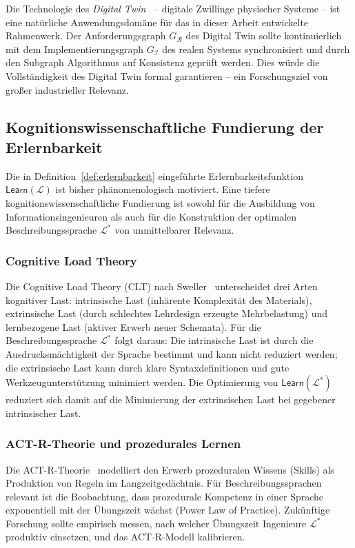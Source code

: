 ﻿\documentclass[a4paper,12pt]{article}
\theoremstyle{definition}
\begin{document}
Die Technologie des \emph{Digital Twin}~\cite{grieves2014} -- digitale Zwillinge
physischer Systeme -- ist eine natürliche Anwendungsdomäne für das in dieser Arbeit
entwickelte Rahmenwerk. Der Anforderungsgraph $G_\mathcal{R}$ des Digital Twin sollte
kontinuierlich mit dem Implementierungsgraph $G_\mathcal{I}$ des realen Systems
synchronisiert und durch den Subgraph Algorithmus auf Konsistenz geprüft werden.
Dies würde die Vollständigkeit des Digital Twin formal garantieren -- ein Forschungsziel
von großer industrieller Relevanz.

\subsection{Kognitionswissenschaftliche Fundierung der Erlernbarkeit}

Die in Definition~\ref{def:erlernbarkeit} eingeführte Erlernbarkeitsfunktion
$\mathsf{Learn}(\mathcal{L})$ ist bisher phänomenologisch motiviert. Eine tiefere
kognitionswissenschaftliche Fundierung ist sowohl für die Ausbildung von
Informationsingenieuren als auch für die Konstruktion der optimalen Beschreibungssprache
$\mathcal{L}^*$ von unmittelbarer Relevanz.

\subsubsection{Cognitive Load Theory}

Die Cognitive Load Theory (CLT) nach Sweller~\cite{sweller1988} unterscheidet drei
Arten kognitiver Last: intrinsische Last (inhärente Komplexität des Materials),
extrinsische Last (durch schlechtes Lehrdesign erzeugte Mehrbelastung) und lernbezogene
Last (aktiver Erwerb neuer Schemata). Für die Beschreibungssprache $\mathcal{L}^*$
folgt daraus: Die intrinsische Last ist durch die Ausdrucksmächtigkeit der Sprache
bestimmt und kann nicht reduziert werden; die extrinsische Last kann durch klare
Syntaxdefinitionen und gute Werkzeugunterstützung minimiert werden. Die Optimierung
von $\mathsf{Learn}(\mathcal{L}^*)$ reduziert sich damit auf die Minimierung der
extrinsischen Last bei gegebener intrinsischer Last.

\subsubsection{ACT-R-Theorie und prozedurales Lernen}

Die ACT-R-Theorie~\cite{anderson1993} modelliert den Erwerb prozeduralen Wissens
(Skills) als Produktion von Regeln im Langzeitgedächtnis. Für Beschreibungssprachen
relevant ist die Beobachtung, dass prozedurale Kompetenz in einer Sprache exponentiell
mit der Übungszeit wächst (Power Law of Practice). Zukünftige Forschung sollte
empirisch messen, nach welcher Übungszeit Ingenieure $\mathcal{L}^*$ produktiv
einsetzen, und das ACT-R-Modell kalibrieren.
\end{document}
